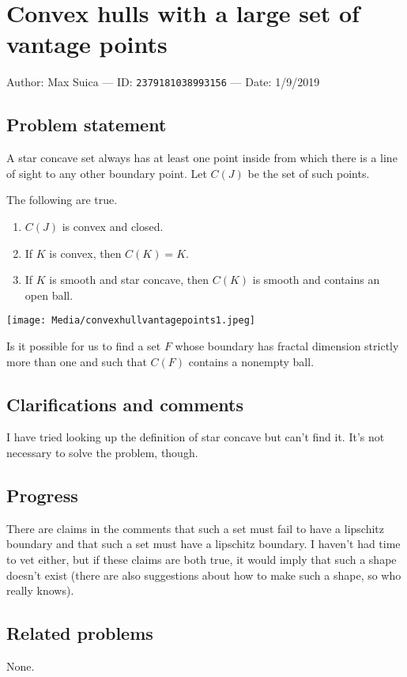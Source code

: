 
\section{Convex hulls with a large set of vantage points}

Author: Max Suica --- ID: \verb`2379181038993156` --- Date: 1/9/2019

\subsection{Problem statement}

A star concave set always has at least one point inside from which there is a line of sight to any other boundary point. Let $C(J)$ be the set of such points.

\begin{lemma}
  The following are true.
  
  \begin{enumerate}
    \item $C(J)$ is convex and closed.
    \item If $K$ is convex, then $C(K)=K$.
    \item If $K$ is smooth and star concave, then $C(K)$ is smooth and contains an open ball.
  \end{enumerate}
\end{lemma}

\texttt{[image: Media/convexhullvantagepoints1.jpeg]}

Is it possible for us to find a set $F$ whose boundary has fractal dimension strictly more than one and such that $C(F)$ contains a nonempty ball.

\subsection{Clarifications and comments}

I have tried looking up the definition of star concave but can't find it. It's not necessary to solve the problem, though.

\subsection{Progress}

There are claims in the comments that such a set must fail to have a lipschitz boundary and that such a set must have a lipschitz boundary. I haven't had time to vet either, but if these claims are both true, it would imply that such a shape doesn't exist (there are also suggestions about how to make such a shape, so who really knows).

\subsection{Related problems}

None.

